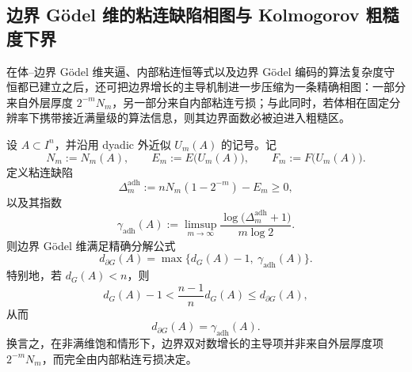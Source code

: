 \subsection{边界 Gödel 维的粘连缺陷相图与 Kolmogorov 粗糙度下界}\label{subsec:conclusion-boundary-godel-gluing-defect-kolmogorov-roughness}
在体--边界 Gödel 维夹逼、内部粘连恒等式以及边界 Gödel 编码的算法复杂度守恒都已建立之后，还可把边界增长的主导机制进一步压缩为一条精确相图：一部分来自外层厚度 \(2^{-m}N_m\)，另一部分来自内部粘连亏损；与此同时，若体相在固定分辨率下携带接近满量级的算法信息，则其边界面数必被迫进入粗糙区。

\begin{theorem}\label{thm:conclusion-boundary-godel-adhesion-defect-phase-diagram}
设 \(A\subset I^n\)，并沿用 dyadic 外近似 \(U_m(A)\) 的记号。记
\[
N_m:=N_m(A),
\qquad
E_m:=E\!\bigl(U_m(A)\bigr),
\qquad
F_m:=F\!\bigl(U_m(A)\bigr).
\]
定义粘连缺陷
\[
\Delta_m^{\mathrm{adh}}
:=
nN_m(1-2^{-m})-E_m
\ge 0,
\]
以及其指数
\[
\gamma_{\mathrm{adh}}(A)
:=
\limsup_{m\to\infty}
\frac{\log\!\bigl(\Delta_m^{\mathrm{adh}}+1\bigr)}{m\log 2}.
\]
则边界 Gödel 维满足精确分解公式
\[
d_{\partial G}(A)
=
\max\bigl\{d_G(A)-1,\ \gamma_{\mathrm{adh}}(A)\bigr\}.
\]
特别地，若 \(d_G(A)<n\)，则
\[
d_G(A)-1
<
\frac{n-1}{n}d_G(A)
\le
d_{\partial G}(A),
\]
从而
\[
d_{\partial G}(A)=\gamma_{\mathrm{adh}}(A).
\]
换言之，在非满维饱和情形下，边界双对数增长的主导项并非来自外层厚度项 \(2^{-m}N_m\)，而完全由内部粘连亏损决定。
\end{theorem}
